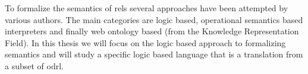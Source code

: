 To formalize the semantics of \ac{rel}s several approaches have been attempted by various authors. The main categories are logic based, operational semantics based interpreters and finally web ontology based (from the Knowledge Representation Field). In this thesis we will focus on the logic based approach to formalizing semantics and will study a specific logic based language that is a translation from a subset of \ac{odrl}.









